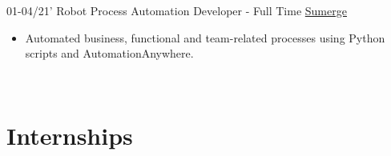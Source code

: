 \documentclass[a4paper]{twentysecondcv} %
\begin{document}
\begin{twenty}
  \twentyitem
  {01-04/21'}
{}
    {Robot Process Automation Developer - Full Time}
    {\href{https://www.sumerge.com/}{Sumerge}}
    {}
    {\vspace{-2mm}\begin{itemize}[topsep=0pt,partopsep=0pt]
    \item Automated business, functional and team-related processes using Python scripts and AutomationAnywhere.
    \end{itemize}} \\
		

        
\end{twenty}



\vspace{-0.25cm}

\section{Internships}{\faAlignJustify}
\end{document}
